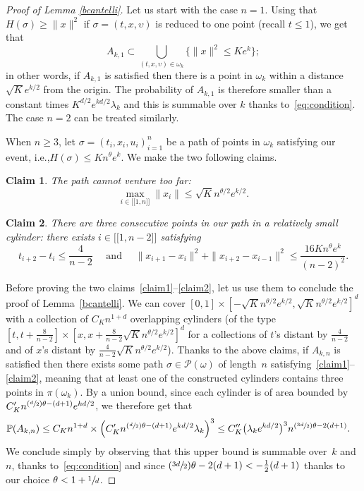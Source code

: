 \documentclass[11pt]{article}
\newcommand{\ie}{i.e.,\xspace}
\numberwithin{equation}{section}
\let\mathcal\mathscr
\newcommand{\Psfrac}[2]{(\sfrac{#1}{#2})}
\newcommand{\lint}{\mathopen{[\![}}
\newcommand{\rint}{\mathclose{]\!]}}
\newtheorem{claim}{Claim}
\theoremstyle{definition}
\newcommand{\cP}{{\ensuremath{\mathcal P}} }
\newcommand{\bbP}{{\ensuremath{\mathbb P}} }
\let\gl\lambda
\let\ups\upsilon
\let\go\omega
\begin{document}
\begin{proof}[Proof of Lemma \ref{bcantelli}]
Let us start with the case $n=1$.
Using that $H(\sigma) \geq \|x\|^2$ if $\sigma =(t,x,\ups)$ is reduced to one point (recall $t\leq 1$), we get that
\[
A_{k,1} \subset \bigcup_{(t,x,\ups) \in \go_k} \{ \|x\|^2 \leq Ke^{k} \};
\]
in other words, if $A_{k,1}$ is satisfied then there
is a point in $\go_k$ within a distance $\sqrt{K} e^{k/2}$ from the origin.
The probability
of $A_{k,1}$ is therefore smaller than a constant times $ K^{d/2} e^{ kd /2} \gl_k$ and this is summable over $k$ thanks to~\eqref{eq:condition}. The case $n=2$ can be treated similarly.

When $n\ge 3$, let $\sigma = (t_i,x_i,u_i)_{i=1}^n$ be a path of points in
$\go_k$ satisfying our event, \ie $H(\sigma) \leq K n^{\theta} e^{k}$.
We make the two following claims.

\setcounter{claim}{0}
\begin{claim}
The path cannot venture too far:
\begin{equation}\label{claim1}
\max_{i\in \lint 1, n\rint} \|x_i\| \le \sqrt{K} n^{\theta/2} e^{k/2}.
\end{equation}
\end{claim}

\begin{claim}
There are three consecutive points in our path in a relatively small cylinder:
there exists $i \in \lint 1,n-2\rint$ satisfying
\begin{equation}\label{claim2}
t_{i+2}-t_i\le \frac{4}{n-2} \quad \text{ and } \quad
\|x_{i+1}-x_i \|^2+\|x_{i+2}-x_{i-1} \|^2
\le
\frac{16 K n^{\theta}e^{k}}{(n-2)^2}.
\end{equation}
\end{claim}

Before proving the two claims~\eqref{claim1}--\eqref{claim2},
let us use them to conclude the proof of Lemma~\ref{bcantelli}.
We can cover
$[0,1] \times [ - \sqrt{K} n^{\theta/2} e^{k/2}, \sqrt{K} n^{\theta/2} e^{k/2} ]^d$
with a collection of
$C_{K} n^{1+d}$ overlapping cylinders
(of the type $[t,t+\frac{8}{n-2}] \times [x,x+ \frac{8 }{n-2}\sqrt{K} n^{\theta/2} e^{k/2} ]^{d}$ for a collections of $t$'s distant by $\frac{4}{n-2}$ and of $x$'s distant by $\frac{4 }{n-2}\sqrt{K} n^{\theta/2} e^{k/2}$).
Thanks to the above claims,
if $A_{k,n}$ is satisfied
then there exists some path $\sigma \in \cP(\go)$
of length~$n$
satisfying~\eqref{claim1}--\eqref{claim2}, meaning that
at least one of the constructed cylinders contains
three points in $\pi(\go_k)$.
By a union bound, since
each cylinder is of area bounded by $C'_{K} n^{\Psfrac{d}{2} \theta -(d+1)} e^{kd/2}$, we therefore get that
\begin{align*}
\bbP(A_{k,n}) &\leq C_{K} n^{1+d} \times \Bigl(C'_{K} n^{\Psfrac{d}{2} \theta - (d+1) } e^{kd/2} \lambda_k\Bigr)^3
\leq C''_{K} \bigl(\gl_k e^{kd/2} \bigr)^3 n^{\Psfrac{3d}{2}\theta-2(d+1)}.
\end{align*}
We conclude simply by observing that this upper bound is summable over~$k$ and~$n$, thanks to~\eqref{eq:condition}
and since $\Psfrac{3d}{2}\theta-2(d+1) < -\frac12 (d+1)$ thanks to our choice $\theta<1+\sfrac{1}{d}$.


\end{proof}
\end{document}
